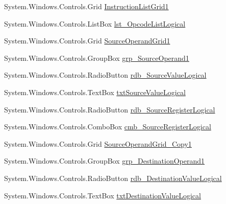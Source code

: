 \begin{DoxyCompactItemize}
\item 
System.\+Windows.\+Controls.\+Grid \hyperlink{class_c_p_u___o_s___simulator_1_1_instructions_window_a8f09b0005016c225169d7e9dd2724053}{Instruction\+List\+Grid1}
\item 
System.\+Windows.\+Controls.\+List\+Box \hyperlink{class_c_p_u___o_s___simulator_1_1_instructions_window_a61ee2cb0ba7197963b1138848778cd3c}{lst\+\_\+\+Opcode\+List\+Logical}
\item 
System.\+Windows.\+Controls.\+Grid \hyperlink{class_c_p_u___o_s___simulator_1_1_instructions_window_a3f9d1afc4455fa6b06c6fab3cdb6aeec}{Source\+Operand\+Grid1}
\item 
System.\+Windows.\+Controls.\+Group\+Box \hyperlink{class_c_p_u___o_s___simulator_1_1_instructions_window_a74e13776576d1a6ee5767e3fc8f6ec7f}{grp\+\_\+\+Source\+Operand1}
\item 
System.\+Windows.\+Controls.\+Radio\+Button \hyperlink{class_c_p_u___o_s___simulator_1_1_instructions_window_ad0e882b0d6d067460309ae6f1dda5d56}{rdb\+\_\+\+Source\+Value\+Logical}
\item 
System.\+Windows.\+Controls.\+Text\+Box \hyperlink{class_c_p_u___o_s___simulator_1_1_instructions_window_afac2309550dd6f1f1589dc7451e8f878}{txt\+Source\+Value\+Logical}
\item 
System.\+Windows.\+Controls.\+Radio\+Button \hyperlink{class_c_p_u___o_s___simulator_1_1_instructions_window_ab8c8622e8a96238fb88e455d60c51e78}{rdb\+\_\+\+Source\+Register\+Logical}
\item 
System.\+Windows.\+Controls.\+Combo\+Box \hyperlink{class_c_p_u___o_s___simulator_1_1_instructions_window_a46a9647a5a6e661afb789b1faa95a15a}{cmb\+\_\+\+Source\+Register\+Logical}
\item 
System.\+Windows.\+Controls.\+Grid \hyperlink{class_c_p_u___o_s___simulator_1_1_instructions_window_a685393ff28189e8c998e2a7dc6018b32}{Source\+Operand\+Grid\+\_\+\+Copy1}
\item 
System.\+Windows.\+Controls.\+Group\+Box \hyperlink{class_c_p_u___o_s___simulator_1_1_instructions_window_ab89f01ff39ce6f5ed461fcf5242be3a5}{grp\+\_\+\+Destination\+Operand1}
\item 
System.\+Windows.\+Controls.\+Radio\+Button \hyperlink{class_c_p_u___o_s___simulator_1_1_instructions_window_a73ba820a305842d3dea1ad79e6e87e6d}{rdb\+\_\+\+Destination\+Value\+Logical}
\item 
System.\+Windows.\+Controls.\+Text\+Box \hyperlink{class_c_p_u___o_s___simulator_1_1_instructions_window_af1a2860f125c3a8e25c73c1b04290438}{txt\+Destination\+Value\+Logical}

\end{DoxyCompactItemize}
